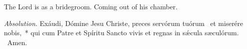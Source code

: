 {

  {
    \def\preant{\setgrefactor{17}\ifprintwhointones{\normalsize\vspace{-\baselineskip}\noindent\emph{Celebrant intones:}

    }{}
    \large}
    \def\preantafter{\setgrefactor{17}\large}
    \def\prepsalm{\normalsize}
    \def\prepsalmtext{\ifprintwhointones{\vspace{-\baselineskip}\noindent\emph{First Cantor intones:}

    }{}}
    \def\anttranslation{The Lord hath said unto me: Thou art My son, this day have I begotten thee.}
    \def\psalmclef{2}
  }

  {
    \bigskip
    \def\preant{\setgrefactor{17}\ifprintwhointones{\noindent\normalsize\emph{Second Cantor intones:}

    }{}
    \large}
    \def\preantafter{\setgrefactor{17}\large}
    \def\prepsalm{\normalsize}
    \def\anttranslation{The Lord is as a bridegroom coming out of his chamber.}
  }

  {
    \def\preant{\setgrefactor{17}\ifprintwhointones{\noindent\normalsize\emph{First Cantor intones:}

    }{}
    \large}
    \def\preantafter{\setgrefactor{17}\large}
    \def\prepsalm{\normalsize}
    \def\anttranslation{Grace is poured into thy lips, therefore God hath blessed thee for ever.}
  }

  \bigskip
  {
    {The Lord is as a bridegroom.}
    {Coming out of his chamber.}
  }

  {
    \bigskip

    \medskip
    \emph{Absolution.} Exáudi, Dómine Jesu Christe, preces servórum tuórum~\dag{} et miserére nobis,~* qui cum Patre et Spíritu Sancto vivis et regnas in sǽcula sæculórum. \Rbar{}~Amen.

}}
